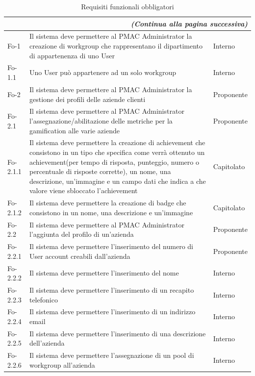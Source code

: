 {{\begin{longtable}{|p{}|p{}|p{}|}
\caption{Requisiti funzionali obbligatori}\\
\hline
\endfirsthead
\multicolumn{3}{r}{\textit{(Continua alla pagina successiva)}}
\endfoot
\multicolumn{3}{l}{\textit{(Continua dalla pagina precedente)}}
\endhead
\hline
\endlastfoot
\textbf{Codice}& \textbf{Descrizione}& \textbf{Fonte}\\
\hline
Fo-1 & Il sistema deve permettere al PMAC Administrator la creazione di workgroup che rappresentano il dipartimento di appartenenza di uno User & Interno\\
\hline
Fo-1.1 & Uno User può appartenere ad un solo workgroup & Interno\\
\hline
Fo-2 & Il sistema deve permettere al PMAC Administrator la gestione dei profili delle aziende clienti & Proponente\\
\hline
Fo-2.1 & Il sistema deve permettere al PMAC Administrator l'assegnazione/abilitazione delle metriche per la gamification alle varie aziende & Proponente\\
\hline
Fo-2.1.1 & Il sistema deve permettere la creazione di achievement che consistono in un tipo che specifica come verrà ottenuto un achievement(per tempo di risposta, punteggio, numero o percentuale di risposte corrette), un nome, una descrizione, un'immagine e un campo dati che indica a che valore viene sbloccato l'achievement & Capitolato\\
\hline
Fo-2.1.2 & Il sistema deve permettere la creazione di badge che consistono in un nome, una descrizione e un'immagine & Capitolato\\
\hline
Fo-2.2 & Il sistema deve permettere al PMAC Administrator l'aggiunta del profilo di un'azienda & Proponente\\
\hline
Fo-2.2.1 & Il sistema deve permettere l'inserimento del numero di User account creabili dall'azienda & Proponente\\
\hline
Fo-2.2.2 & Il sistema deve permettere l'inserimento del nome & Interno\\
\hline
Fo-2.2.3 & Il sistema deve permettere l'inserimento di un recapito telefonico & Interno\\
\hline
Fo-2.2.4 & Il sistema deve permettere l'inserimento di un indirizzo email & Interno\\
\hline
Fo-2.2.5 & Il sistema deve permettere l'inserimento di una descrizione dell'azienda & Interno\\
\hline
Fo-2.2.6 & Il sistema deve permettere l'assegnazione di un pool di workgroup all'azienda & Interno\\

\end{longtable}}}
